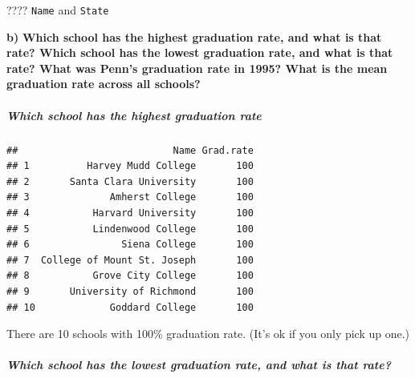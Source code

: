 \documentclass[]{article}
\newenvironment{Shaded}{\begin{snugshade}}{\end{snugshade}}
\newcommand{\KeywordTok}[1]{\textcolor[rgb]{0.13,0.29,0.53}{\textbf{#1}}}
\newcommand{\StringTok}[1]{\textcolor[rgb]{0.31,0.60,0.02}{#1}}
\newcommand{\CommentTok}[1]{\textcolor[rgb]{0.56,0.35,0.01}{\textit{#1}}}
\newcommand{\OperatorTok}[1]{\textcolor[rgb]{0.81,0.36,0.00}{\textbf{#1}}}
\newcommand{\NormalTok}[1]{#1}
\let\oldsubparagraph\subparagraph
\renewcommand{\subparagraph}[1]{\oldsubparagraph{#1}\mbox{}}
\begin{document}
???? \texttt{Name} and \texttt{State}

\textbf{b)} \textbf{Which school has the highest graduation rate, and
what is that rate? Which school has the lowest graduation rate, and what
is that rate? What was Penn's graduation rate in 1995? What is the mean
graduation rate across all schools?}

\subparagraph{Which school has the highest graduation
rate}\label{which-school-has-the-highest-graduation-rate}

\begin{Shaded}
\end{Shaded}

\begin{verbatim}
##                           Name Grad.rate
## 1          Harvey Mudd College       100
## 2       Santa Clara University       100
## 3              Amherst College       100
## 4           Harvard University       100
## 5           Lindenwood College       100
## 6                Siena College       100
## 7  College of Mount St. Joseph       100
## 8           Grove City College       100
## 9       University of Richmond       100
## 10             Goddard College       100
\end{verbatim}

\begin{Shaded}
\end{Shaded}

There are 10 schools with 100\% graduation rate. (It's ok if you only
pick up one.)

\subparagraph{Which school has the lowest graduation rate, and what is
that
rate?}\label{which-school-has-the-lowest-graduation-rate-and-what-is-that-rate}

\begin{Shaded}
\end{Shaded}
\end{document}
